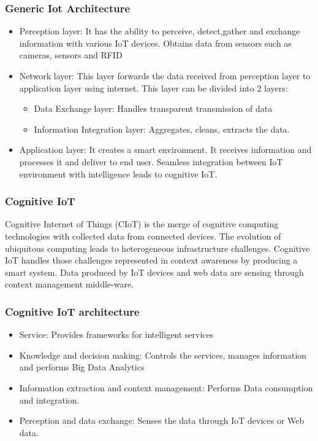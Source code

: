 \documentclass{article}
\begin{document}
\subsubsection{Generic Iot Architecture}
\begin{itemize}
    \item{Perception layer: It has the ability to perceive, detect,gather and exchange information with various IoT devices. Obtains data from sensors such as cameras, sensors and RFID}
    \item{Network layer: This layer forwards the data received from perception layer to application layer using internet. This layer can be divided into 2 layers:\begin{itemize}
        \item{Data Exchange layer: Handles transparent transmission of data}
        \item{Information Integration layer: Aggregates, cleans, extracts the data. }
    \end{itemize}}
    \item{Application layer: It creates a smart environment. It receives information and processes it and deliver to end user. Seamless integration between IoT environment with intelligence leads to cognitive IoT.} 
\end{itemize}
\subsubsection{Cognitive IoT}
Cognitive Internet of Things (CIoT) is the merge of cognitive computing technologies with collected data from connected devices. The evolution of ubiquitous computing leads to heterogeneous infrastructure challenges. Cognitive IoT handles those challenges represented in context awareness by producing a smart system. Data produced by IoT devices and web data are sensing through context management middle-ware.
\subsubsection{Cognitive IoT architecture}
\begin{itemize}
    \item{Service: Provides frameworks for intelligent services}
    \item{Knowledge and decision making: Controls the services, manages information and performs Big Data Analytics}
    \item{Information extraction and context management: Performs Data consumption and integration.}
    \item{Perception and data exchange: Senses the data through IoT devices or Web data.}
\end{itemize}
\end{document}
